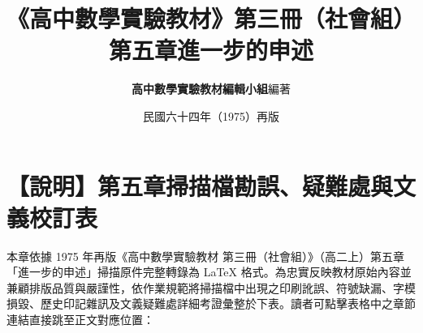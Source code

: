 \documentclass[a4paper,12pt,twoside]{article}
\title{\LARGE\textbf{《高中數學實驗教材》第三冊（社會組）}\\[0.5em] \Large\textbf{第五章\quad 進一步的申述}}
\author{\textbf{高中數學實驗教材編輯小組}\quad 編著}
\date{民國六十四年（1975）再版}
\begin{document}
\maketitle
\thispagestyle{firstpage}

\section*{【說明】第五章掃描檔勘誤、疑難處與文義校訂表}
\label{sec:errata_notes_b3_ch5}
\label{sec:current_errata}

本章依據 1975 年再版《高中數學實驗教材 第三冊（社會組）》（高二上）第五章「進一步的申述」掃描原件完整轉錄為 \LaTeX{} 格式。為忠實反映教材原始內容並兼顧排版品質與嚴謹性，依作業規範將掃描檔中出現之印刷訛誤、符號缺漏、字模損毀、歷史印記雜訊及文義疑難處詳細考證彙整於下表。讀者可點擊表格中之章節連結直接跳至正文對應位置：
\end{document}
